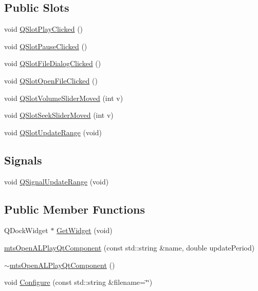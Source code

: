 \subsection*{Public Slots}
\begin{DoxyCompactItemize}
\item 
void \hyperlink{classmts_open_a_l_play_qt_component_a9a25f6dd1813665a5a60f249f596e88f}{Q\+Slot\+Play\+Clicked} ()
\item 
void \hyperlink{classmts_open_a_l_play_qt_component_ac126ec66be8ed659c39d2223931a74ce}{Q\+Slot\+Pause\+Clicked} ()
\item 
void \hyperlink{classmts_open_a_l_play_qt_component_a196711ea4b1b44b244c8066c8745cecc}{Q\+Slot\+File\+Dialog\+Clicked} ()
\item 
void \hyperlink{classmts_open_a_l_play_qt_component_a573df09363219c19e4379e3c7d797002}{Q\+Slot\+Open\+File\+Clicked} ()
\item 
void \hyperlink{classmts_open_a_l_play_qt_component_acc3b3c342da250ef5c142c927ce65fce}{Q\+Slot\+Volume\+Slider\+Moved} (int v)
\item 
void \hyperlink{classmts_open_a_l_play_qt_component_ae254af009b2c63c13f65481cdacc9a5a}{Q\+Slot\+Seek\+Slider\+Moved} (int v)
\item 
void \hyperlink{classmts_open_a_l_play_qt_component_a429175bcd456b5c0cbc5b6e65f8cb6dd}{Q\+Slot\+Update\+Range} (void)
\end{DoxyCompactItemize}
\subsection*{Signals}
\begin{DoxyCompactItemize}
\item 
void \hyperlink{classmts_open_a_l_play_qt_component_a88893d1a991cd9057aec60251f24e7c9}{Q\+Signal\+Update\+Range} (void)
\end{DoxyCompactItemize}
\subsection*{Public Member Functions}
\begin{DoxyCompactItemize}
\item 
Q\+Dock\+Widget $\ast$ \hyperlink{classmts_open_a_l_play_qt_component_a7e2e578a40881a0f30a6bbcae7f3f7a2}{Get\+Widget} (void)
\item 
\hyperlink{classmts_open_a_l_play_qt_component_a6ea7c1ad8d2983152631f672426fbf45}{mts\+Open\+A\+L\+Play\+Qt\+Component} (const std\+::string \&name, double update\+Period)
\item 
\hyperlink{classmts_open_a_l_play_qt_component_a819a527bda53377d22c3baa6169d13cb}{$\sim$mts\+Open\+A\+L\+Play\+Qt\+Component} ()
\item 
void \hyperlink{classmts_open_a_l_play_qt_component_ad660372ea570ac8ea5585a897f5f6c74}{Configure} (const std\+::string \&filename=\char`\"{}\char`\"{})
\end{DoxyCompactItemize}
